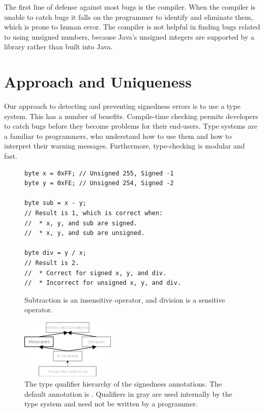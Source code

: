 \documentclass{sig-alternate-05-2015}
\def\<#1>{\codeid{#1}}
\begin{document}
The first line of defense against most bugs is the compiler. When the
compiler is unable to catch bugs it falls on the programmer to identify and
eliminate them, which is prone to human error. The compiler
is not helpful in finding bugs related to using unsigned
numbers, because Java's unsigned
integers are supported by a library rather than built into Java.


\section{Approach and Uniqueness}

Our approach to detecting and preventing signedness errors is to use a type
system. This has a number of benefits.
%
Compile-time checking permits developers
to catch bugs before they become problems for their end-users.
%
Type systems are a familiar to programmers, who understand how to use them
and how to interpret their warning messages.
%
Furthermore, type-checking is modular and fast.

\begin{figure}
\begin{lstlisting}
byte x = 0xFF; // Unsigned 255, Signed -1
byte y = 0xFE; // Unsigned 254, Signed -2

byte sub = x - y;
// Result is 1, which is correct when:
//  * x, y, and sub are signed.
//  * x, y, and sub are unsigned.

byte div = y / x;
// Result is 2.
//  * Correct for signed x, y, and div.
//  * Incorrect for unsigned x, y, and div.
\end{lstlisting}
\vspace{-10pt}
\caption{Subtraction is an insensitive operator, and
  division is a sensitive operator.}
\label{fig:operators}
\end{figure}


\begin{figure}
    \centering
    \includegraphics[width=0.4\textwidth]{signedness}
    \caption{The type qualifier hierarchy of the signedness annotations.
The default annotation is \<@Signed>.
Qualifiers in gray are used internally by the type system and need not be
written by a programmer.}
    \label{fig:type-hierarchy}
\end{figure}
\end{document}
